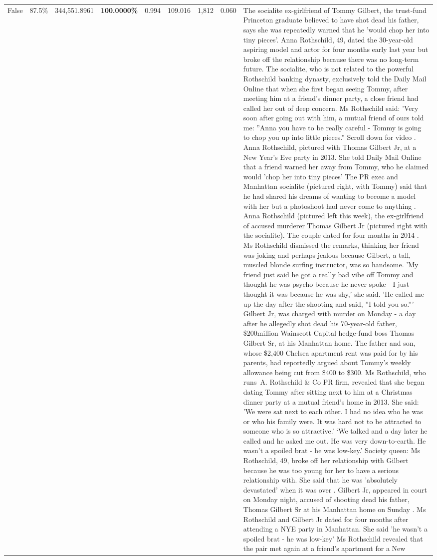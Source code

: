 \begin{table}[H]
\begin{tabular}{lllrlllll}
False & 87.5\% & 344,551.8961 & \bfseries \color{red} 100.0000\% & 0.994 & 109.016 & 1,812 & 0.060 & The socialite ex-girlfriend of Tommy Gilbert, the trust-fund Princeton graduate believed to have shot dead his father, says she was repeatedly warned that he 'would chop her into tiny pieces'. Anna Rothschild, 49, dated the 30-year-old aspiring model and actor for four months early last year but broke off the relationship because there was no long-term future. The socialite, who is not related to the powerful Rothschild banking dynasty, exclusively told the Daily Mail Online that when she first began seeing Tommy, after meeting him at a friend's dinner party, a close friend had called her out of deep concern. Ms Rothschild said: 'Very soon after going out with him, a mutual friend of ours told me: ''Anna you have to be really careful - Tommy is going to chop you up into little pieces.'' Scroll down for video . Anna Rothschild, pictured with Thomas Gilbert Jr, at a New Year's Eve party in 2013. She told Daily Mail Online that a friend warned her away from Tommy, who he claimed would 'chop her into tiny pieces' The PR exec and Manhattan socialite (pictured right, with Tommy) said that he had shared his dreams of wanting to become a model with her but a photoshoot had never come to anything . Anna Rothschild (pictured left this week), the ex-girlfriend of accused murderer Thomas Gilbert Jr (pictured right with the socialite). The couple dated for four months in 2014 . Ms Rothschild dismissed the remarks, thinking her friend was joking and perhaps jealous because Gilbert, a tall, muscled blonde surfing instructor, was so handsome. 'My friend just said he got a really bad vibe off Tommy and thought he was psycho because he never spoke - I just thought it was because he was shy,' she said. 'He called me up the day after the shooting and said, ''I told you so.''' Gilbert Jr, was charged with murder on Monday - a day after he allegedly shot dead his 70-year-old father, \$200million Wainscott Capital hedge-fund boss Thomas Gilbert Sr, at his Manhattan home. The father and son, whose \$2,400 Chelsea apartment rent was paid for by his parents, had reportedly argued about Tommy's weekly allowance being cut from \$400 to \$300. Ms Rothschild, who runs A. Rothschild \& Co PR firm, revealed that she began dating Tommy after sitting next to him at a Christmas dinner party at a mutual friend's home in 2013. She said: 'We were sat next to each other. I had no idea who he was or who his family were. It was hard not to be attracted to someone who is so attractive.' ‘We talked and a day later he called and he asked me out. He was very down-to-earth. He wasn’t a spoiled brat - he was low-key.’ Society queen: Ms Rothschild, 49, broke off her relationship with Gilbert because he was too young for her to have a serious relationship with. She said that he was 'absolutely devastated' when it was over . Gilbert Jr, appeared in court on Monday night, accused of shooting dead his father, Thomas Gilbert Sr at his Manhattan home on Sunday . Ms Rothschild and Gilbert Jr dated for four months after attending a NYE party in Manhattan. She said 'he wasn't a spoiled brat - he was low-key' Ms Rothschild revealed that the pair met again at a friend’s apartment for a New 
\end{tabular}
\end{table}
